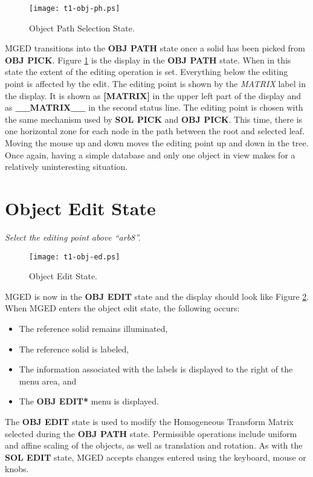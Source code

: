 \begin{figure}
\centering \texttt{[image: t1-obj-ph.ps]}
\caption{Object Path Selection State.}
\label{t1-obj-ph}
\end{figure}

MGED transitions into the {\bf OBJ PATH} state once a solid has been
picked from {\bf OBJ PICK}. Figure \ref{t1-obj-ph} is the display in
the {\bf OBJ PATH} state.  When in this state the extent of the editing
operation is set.  Everything below the editing point is affected by the
edit.  The editing point is shown by the {\sl MATRIX} label in the
display.  It is shown as {\bf [MATRIX]} in the upper left part of the
display and as {\bf \_\_MATRIX\_\_} in the second status line.  The editing
point is chosen with the same mechanism used by {\bf SOL PICK} and
{\bf OBJ PICK}.  This time, there is one horizontal zone for each node in
the path between the root and selected leaf.  Moving the mouse up and down
moves the editing point up and down in the tree.  Once again, having a
simple database and only one object in view makes for a relatively
uninteresting situation.

\section{Object Edit State}

\noindent
{\em Select the editing point above ``arb8''.}\\

\begin{figure}
\centering \texttt{[image: t1-obj-ed.ps]}
\caption{Object Edit State.}
\label{t1-obj-ed}
\end{figure}

MGED is now in the {\bf OBJ EDIT} state and the display should look like
Figure \ref{t1-obj-ed}.
When MGED enters the object edit state, the following occurs:
\begin{itemize}
\item The reference solid remains illuminated,
\item The reference solid is labeled,
\item The information associated with the labels is displayed to the right
of the menu area, and
\item The {\bf *OBJ EDIT*} menu is displayed.
\end{itemize}

The {\bf OBJ EDIT} state is used to modify the
Homogeneous Transform Matrix selected during the {\bf OBJ PATH} state.
Permissible operations include uniform and affine scaling of the objects,
as well as translation and rotation.
As with the {\bf SOL EDIT} state, MGED accepts changes entered using
the keyboard, mouse or knobs.

